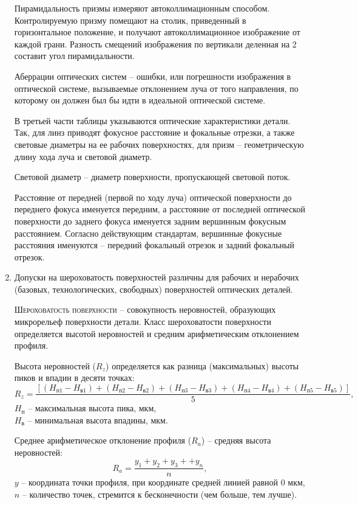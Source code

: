 \begin{enumerate}
	Пирамидальность призмы измеряют автоколлимационным способом. Контролируемую призму помещают на столик, приведенный в горизонтальное положение, и получают автоколлимационное изображение от каждой грани. Разность смещений изображения по вертикали деленная на 2 составит угол пирамидальности.
	
	Аберрации оптических систем -- ошибки, или погрешности изображения в оптической системе, вызываемые отклонением луча от того направления, по которому он должен был бы идти в идеальной оптической системе.
	
	В третьей части таблицы указываются оптические характеристики детали. Так, для линз приводят фокусное расстояние и фокальные отрезки, а также световые диаметры на ее рабочих поверхностях, для призм -- геометрическую длину хода луча и световой диаметр.
	
	Световой диаметр -- диаметр поверхности, пропускающей световой поток.
	
	Расстояние от передней (первой по ходу луча) оптической поверхности до переднего фокуса именуется передним, а расстояние от последней оптической поверхности до заднего фокуса именуется задним вершинным фокусным расстоянием. Согласно действующим стандартам, вершинные фокусные расстояния именуются -- передний фокальный отрезок и задний фокальный отрезок.
	\item Допуски на шероховатость поверхностей различны для рабочих и нерабочих (базовых, технологических, свободных) поверхностей оптических деталей.
	
	\textsc{Шероховатость поверхности} -- совокупность неровностей, образующих микрорельеф поверхности детали. Класс шероховатости поверхности определяется высотой неровностей и средним арифметическим отклонением профиля.
	
	Высота неровностей ($R_z$) определяется как разница (максимальных) высоты пиков и впадин в десяти точках: 
	\begin{equation*}
	R_z = \dfrac{[(H_\text{п1}-H_\text{в1})+(H_\text{п2}-H_\text{в2})+(H_\text{п3}-H_\text{в3})+(H_\text{п4}-H_\text{в4})+(H_\text{п5}-H_\text{в5})]}{5},
	\end{equation*}
	$H_\text{п}$ -- максимальная высота пика, мкм, \\
	$H_\text{в}$ -- минимальная высота впадины, мкм.
	
	Среднее арифметическое отклонение профиля ($R_a$) -- средняя высота неровностей:
	\begin{equation*}
	R_a = \dfrac{y_1+y_2+y_3++y_n}{n},
	\end{equation*}
	$y$ -- координата точки профиля, при координате средней линией равной 0 мкм,\\
	$n$ -- количество точек, стремится к бесконечности (чем больше, тем лучше).
	

\end{enumerate}
